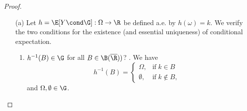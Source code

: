 \documentclass{article} %
\begin{document}
\begin{proof}
\begin{itemize}
\item[(a)] Let $h=\E[Y \cond \G]:  \Omega \to \R$ be defined a.e. by $h(\omega)=k$. We verify the two conditions for the existence (and essential uniqueness) of conditional expectation.
	\begin{enumerate}
		\item $h^{-1} (B) \in \G$ for all $B \in \B(\overline{\R}))$? \greencheck. We have 
		\[ h^{-1}(B) = 
		\begin{cases}
		\Omega, & \text{if} \; k \in B \\
		\emptyset, & \text{if} \; k \notin B,	
		\end{cases} \]
		and $\Omega, \emptyset \in \G$.
		 
		\begin{figure}[H]
		\centering	
		\end{figure}
		

\end{enumerate}
\end{itemize}
\end{proof}
\end{document}
